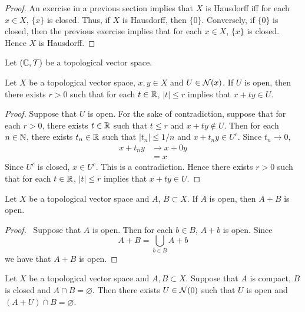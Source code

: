 \documentclass{book}
\begin{document}
	\begin{proof}
		An exercise in a previous section implies that $X$ is Hausdorff iff for each $x \in X$, $\{x\}$ is closed. Thus, if $X$ is Hausdorff, then $\{0\}$. Conversely, if $\{0\}$ is closed, then the previous exercise implies that for each $x \in X$, $\{x\}$ is closed. Hence $X$ is Hausdorff.
	\end{proof}
	
	\begin{ex}
		Let $(\mathbb{C}, \mathcal{T})$ be a topological vector space.  
	\end{ex}
	
	\begin{ex}
		Let $X$ be a topological vector space, $x,y \in X$ and $U \in \mathcal{N}(x)$. If $U$ is open, then there exists $r >0$ such that for each $t \in \mathbb{R}$, $|t| \leq r$ implies that $x+ ty \in U$.
	\end{ex}

	\begin{proof}
		Suppose that $U$ is open. For the sake of contradiction, suppose that for each $r > 0$, there exists $t \in \mathbb{R}$ such that $t \leq r$ and $x+ ty \not \in U$. Then for each $n \in \mathbb{N}$, there exists $t_n \in \mathbb{R}$ such that $|t_n| \leq 1/n$ and $x + t_ny \in U^c$. Since $t_n \rightarrow 0$, 
		\begin{align*}
			x + t_ny 
			& \rightarrow x + 0y \\
			&= x
		\end{align*}
		Since $U^c$ is closed, $x \in U^c$. This is a contradiction. Hence there exists $r >0$ such that for each $t \in \mathbb{R}$, $|t| \leq r$ implies that $x+ ty \in U$.
	\end{proof}

	\begin{ex}
		Let $X$ be a topological vector space and $A$, $B \subset X$. If $A$ is open, then $A + B$ is open.
	\end{ex}
	
	\begin{proof} \
		Suppose that $A$ is open. Then for each $b \in B$, $A + b$ is open. Since 
		$$A + B = \bigcup_{b \in B} A + b$$
		we have that $A + B$ is open.
	\end{proof}

	\begin{ex}
		Let $X$ be a topological vector space and $A,B \subset X$. Suppose that $A$ is compact, $B$ is closed and $A \cap B = \varnothing$. Then there exists $U \in \mathcal{N}(0)$ such that $U$ is open and $(A + U) \cap B = \varnothing$. 
	\end{ex}
	
\end{document}
